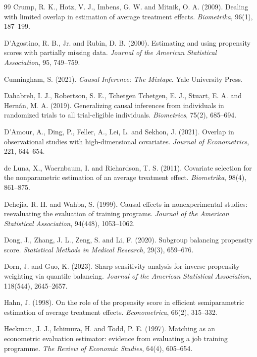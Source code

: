 \documentclass[11pt,a4paper]{article}
\theoremstyle{plain}
\theoremstyle{definition}
\begin{document}
\begin{thebibliography}{99}
 Crump, R. K., Hotz, V. J., Imbens, G. W. and Mitnik, O. A. (2009). Dealing with limited overlap in estimation of average treatment effects. \emph{Biometrika}, 96(1), 187--199.

 D'Agostino, R. B., Jr. and Rubin, D. B. (2000). Estimating and using propensity scores with partially missing data. \emph{Journal of the American Statistical Association}, 95, 749--759.

 Cunningham, S. (2021). \emph{Causal Inference: The Mixtape}. Yale University Press.

 Dahabreh, I. J., Robertson, S. E., Tchetgen Tchetgen, E. J., Stuart, E. A. and Hernán, M. A. (2019). Generalizing causal inferences from individuals in randomized trials to all trial-eligible individuals. \emph{Biometrics}, 75(2), 685--694.

 D'Amour, A., Ding, P., Feller, A., Lei, L. and Sekhon, J. (2021). Overlap in observational studies with high-dimensional covariates. \emph{Journal of Econometrics}, 221, 644--654.

 de Luna, X., Waernbaum, I. and Richardson, T. S. (2011). Covariate selection for the nonparametric estimation of an average treatment effect. \emph{Biometrika}, 98(4), 861--875.

 Dehejia, R. H. and Wahba, S. (1999). Causal effects in nonexperimental studies: reevaluating the evaluation of training programs. \emph{Journal of the American Statistical Association}, 94(448), 1053--1062.

 Dong, J., Zhang, J. L., Zeng, S. and Li, F. (2020). Subgroup balancing propensity score. \emph{Statistical Methods in Medical Research}, 29(3), 659--676.

 Dorn, J. and Guo, K. (2023). Sharp sensitivity analysis for inverse propensity weighting via quantile balancing. \emph{Journal of the American Statistical Association}, 118(544), 2645--2657.

 Hahn, J. (1998). On the role of the propensity score in efficient semiparametric estimation of average treatment effects. \emph{Econometrica}, 66(2), 315--332.

 Heckman, J. J., Ichimura, H. and Todd, P. E. (1997). Matching as an econometric evaluation estimator: evidence from evaluating a job training programme. \emph{The Review of Economic Studies}, 64(4), 605--654.


\end{thebibliography}
\end{document}
